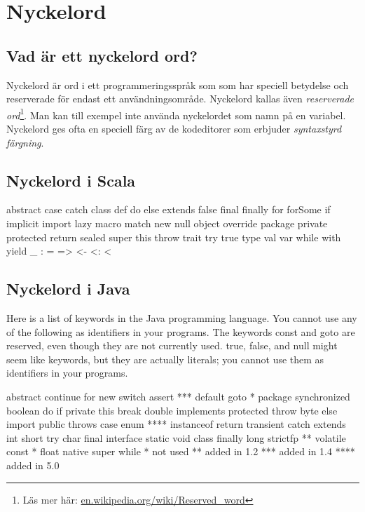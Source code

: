
\chapter{Nyckelord}\label{appendix:keywords}

\section{Vad är ett nyckelord ord?}

Nyckelord är ord i ett programmeringsspråk som som har speciell betydelse och reserverade för endast ett användningsområde. Nyckelord kallas även \emph{reserverade ord}\footnote{Läs mer här: \href{https://en.wikipedia.org/wiki/Reserved\_word}{en.wikipedia.org/wiki/Reserved\_word}}. 
Man kan till exempel inte använda nyckelordet  som namn på en variabel. Nyckelord ges ofta en speciell färg av de kodeditorer som erbjuder \emph{syntaxstyrd färgning}. 

\section{Nyckelord i Scala} 

\begin{Code}
abstract    case        catch       class       def
do          else        extends     false       final
finally     for         forSome     if          implicit
import      lazy        macro       match       new
null        object      override    package     private
protected   return      sealed      super       this
throw       trait       try         true        type
val         var         while       with        yield
_    :    =    =>    <-    <:    <%
\end{Code}


\section{Nyckelord i Java}

Here is a list of keywords in the Java programming language. You cannot use any of the following as identifiers in your programs. The keywords const and goto are reserved, even though they are not currently used. true, false, and null might seem like keywords, but they are actually literals; you cannot use them as identifiers in your programs.

\begin{Code}[language=Java]
abstract 	continue 	for 	new 	switch
assert *** 	default 	goto * 	package 	synchronized
boolean 	do 	if 	private 	this
break 	double 	implements 	protected 	throw
byte 	else 	import 	public 	throws
case 	enum **** 	instanceof 	return 	transient
catch 	extends 	int 	short 	try
char 	final 	interface 	static 	void
class 	finally 	long 	strictfp ** 	volatile
const * 	float 	native 	super 	while
* 	  	not used
** 	  	added in 1.2
*** 	  	added in 1.4
**** 	  	added in 5.0
\end{Code}

